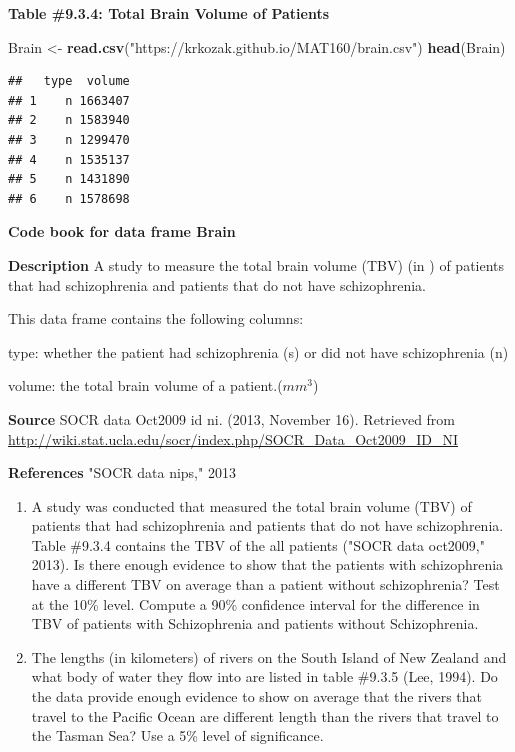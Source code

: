 \documentclass[
]{book}
\newenvironment{Shaded}{\begin{snugshade}}{\end{snugshade}}
\newcommand{\KeywordTok}[1]{\textcolor[rgb]{0.13,0.29,0.53}{\textbf{#1}}}
\newcommand{\NormalTok}[1]{#1}
\newcommand{\StringTok}[1]{\textcolor[rgb]{0.31,0.60,0.02}{#1}}
\begin{document}
\textbf{Table \#9.3.4: Total Brain Volume of Patients}

\begin{Shaded}
\begin{Highlighting}[]
\NormalTok{Brain <-}\StringTok{ }\KeywordTok{read.csv}\NormalTok{(}\StringTok{"https://krkozak.github.io/MAT160/brain.csv"}\NormalTok{)}
\KeywordTok{head}\NormalTok{(Brain)}
\end{Highlighting}
\end{Shaded}

\begin{verbatim}
##   type  volume
## 1    n 1663407
## 2    n 1583940
## 3    n 1299470
## 4    n 1535137
## 5    n 1431890
## 6    n 1578698
\end{verbatim}

\textbf{Code book for data frame Brain}

\textbf{Description}
A study to measure the total brain volume (TBV) (in ) of patients that had schizophrenia and patients that do not have schizophrenia.

This data frame contains the following columns:

type: whether the patient had schizophrenia (s) or did not have schizophrenia (n)

volume: the total brain volume of a patient.(\(mm^3\))

\textbf{Source}
SOCR data Oct2009 id ni. (2013, November 16). Retrieved from
\url{http://wiki.stat.ucla.edu/socr/index.php/SOCR_Data_Oct2009_ID_NI}

\textbf{References}
"SOCR data nips," 2013

\begin{enumerate}
\def\labelenumi{\arabic{enumi}.}
\setcounter{enumi}{3}
\item
  A study was conducted that measured the total brain volume (TBV) of patients that had schizophrenia and patients that do not have schizophrenia. Table \#9.3.4 contains the TBV of the all patients ("SOCR data oct2009," 2013). Is there enough evidence to show that the patients with schizophrenia have a different TBV on average than a patient without schizophrenia? Test at the 10\% level. Compute a 90\% confidence interval for the difference in TBV of patients with Schizophrenia and patients without Schizophrenia.
\item
  The lengths (in kilometers) of rivers on the South Island of New Zealand and what body of water they flow into are listed in table \#9.3.5 (Lee, 1994). Do the data provide enough evidence to show on average that the rivers that travel to the Pacific Ocean are different length than the rivers that travel to the Tasman Sea? Use a 5\% level of significance.
\end{enumerate}
\end{document}
